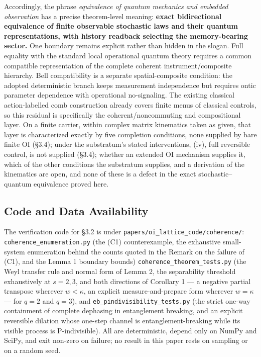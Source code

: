\documentclass[
]{article}
\begin{document}
Accordingly, the phrase \emph{equivalence of quantum mechanics and
embedded observation} has a precise theorem-level meaning: \textbf{exact
bidirectional equivalence of finite observable stochastic laws and their
quantum representations, with history readback selecting the
memory-bearing sector.} One boundary remains explicit rather than hidden
in the slogan. Full equality with the standard local operational quantum
theory requires a common compatible representation of the complete
coherent instrument/composite hierarchy. Bell compatibility is a
separate spatial-composite condition: the adopted deterministic branch
keeps measurement independence but requires ontic parameter dependence
with operational no-signaling. The existing classical action-labelled
comb construction already covers finite menus of classical controls, so
this residual is specifically the coherent/noncommuting and
compositional layer. On a finite carrier, within complex matrix
kinematics taken as given, that layer is characterized exactly by five
completion conditions, none supplied by bare finite OI (§3.4); under the
substratum's stated interventions, (iv), full reversible control, is not
supplied (§3.4); whether an extended OI mechanism supplies it, which of
the other conditions the substratum supplies, and a derivation of the
kinematics are open, and none of these is a defect in the exact
stochastic--quantum equivalence proved here.

\hypertarget{code-and-data-availability}{%
\subsection{Code and Data
Availability}\label{code-and-data-availability}}

The verification code for §3.2 is under
\texttt{papers/oi\_lattice\_code/coherence/}:
\texttt{coherence\_enumeration.py} (the (C1) counterexample, the
exhaustive small-system enumeration behind the counts quoted in the
Remark on the failure of (C1), and the Lemma 1 boundary bounds)
\texttt{coherence\_theorem\_tests.py} (the Weyl transfer rule and normal
form of Lemma 2, the separability threshold exhaustively at
\(s = 2, 3\), and both directions of Corollary 1 --- a negative partial
transpose wherever \(w < \kappa\), an explicit measure-and-prepare form
wherever \(w = \kappa\) --- for \(q = 2\) and \(q = 3\)), and
\texttt{eb\_pindivisibility\_tests.py} (the strict one-way containment
of complete dephasing in entanglement breaking, and an explicit
reversible dilation whose one-step channel is entanglement-breaking
while its visible process is P-indivisible). All are deterministic,
depend only on NumPy and SciPy, and exit non-zero on failure; no result
in this paper rests on sampling or on a random seed.
\end{document}
